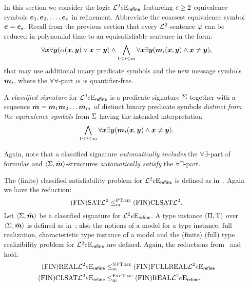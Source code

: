 In this section we consider the logic $\mathcal{L}^{2}_{{}}{e}\mathrm{E}_{\mathsf{refine}}$
featureing $e \geq 2$ equivalence symbols $\bm{e}_{1},\bm{e}_{2},\dots,\bm{e}_{e}$ in
refinement. Abbreviate the coarsest equivalence symbol $\bm{e} = \bm{e}_{e}$.
Recall from the previous section that every $\mathcal{L}^{2}$-sentence $\varphi$ can be
reduced in polynomial time to an equisatisfiable sentence in the form:
\begin{equation*}
  \forall\bm{x}\forall\bm{y} (\alpha(\bm{x},\bm{y}) \lor \bm{x} = \bm{y}) \land
  \bigwedge_{1 \leq i \leq m} \forall\bm{x}\exists\bm{y}
  (\bm{m}_{i}(\bm{x},\bm{y}) \land \bm{x} \neq \bm{y}),
\end{equation*}
that may use additional unary predicate symbols and the new message symbols
$\bm{m}_{i}$, where the $\forall\forall$-part $\alpha$ is quantifier-free.
\begin{definition}
A \emph{classified signature} for $\mathcal{L}^{2}_{{}}{e}\mathrm{E}_{\mathsf{refine}}$ is a
predicate signature $\mathrm{\Sigma}$ together with a sequence $\sms =
\smm1\smm2\dots\smm\nm$ of distinct binary predicate symbols \emph{distinct
from the equivalence symbols} from $\mathrm{\Sigma}$ having the intended interpretation
\begin{equation*}
  \bigwedge_{1 \leq i \leq m} \forall\bm{x}\exists\bm{y} 
  (\bm{m}_{i}(\bm{x},\bm{y}) \land \bm{x} \neq \bm{y}).
\end{equation*}
\end{definition}
Again, note that a classified signature \emph{automatically includes} the
$\forall\exists$-part of formulas and $\left\langle \mathrm{\Sigma},\bar{\bm{m}} \right\rangle$-structures
\emph{automatically satisfy} the $\forall\exists$-part.

The (finite) classified satisfiability problem for
$\mathcal{L}^{2}_{{}}{e}\mathrm{E}_{\mathsf{refine}}$ is defined as in~.
Again we have the reduction:
\[
  \mathrm{(FIN)SAT}\mathcal{L}^{2} \leq_{\mathrm{m}}^{\text{\normalfont{\scshape PTime}}} \mathrm{(FIN)CLSAT}\mathcal{L}^{2}.
\]
Let $\left\langle \mathrm{\Sigma},\bar{\bm{m}} \right\rangle$ be a classified signature for
$\mathcal{L}^{2}_{{}}{e}\mathrm{E}_{\mathsf{refine}}$.
A type instance $(\Pi,\mathrm{T})$ over $\left\langle \mathrm{\Sigma},\bar{\bm{m}} \right\rangle$ is defined as
in~; also the notions of a model for a type instance,
full realization, characteristic type instance of a model and the (finite)
(full) type realizibility problem for $\mathcal{L}^{2}_{{}}{e}\mathrm{E}_{\mathsf{refine}}$ are
defined. Again, the reductions from~
and~ hold:
\begin{align*}
  \mathrm{(FIN)REAL}\mathcal{L}^{2}_{{}}{e}\mathrm{E}_{\mathsf{refine}} &\leq_{\mathrm{m}}^{\text{\normalfont{\scshape NPTime}}} 
  \mathrm{(FIN)FULLREAL}\mathcal{L}^{2}_{{}}{e}\mathrm{E}_{\mathsf{refine}} \\
  \mathrm{(FIN)CLSAT}\mathcal{L}^{2}_{{}}{e}\mathrm{E}_{\mathsf{refine}} &\leq_{\mathrm{m}}^{\text{\normalfont{\scshape ExpTime}}}
  \mathrm{(FIN)REAL}\mathcal{L}^{2}_{{}}{e}\mathrm{E}_{\mathsf{refine}}.
\end{align*}

